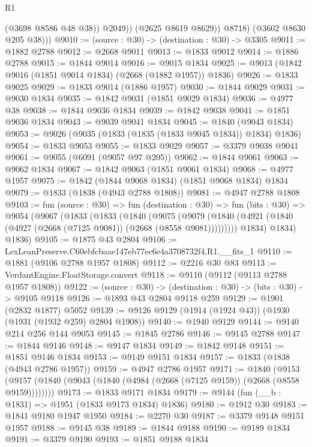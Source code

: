 \begin{lexlean}{R1}
\begin{coremodule}
                  (@3698 @8586 @48 @38))
                @2049))
            (@2625 @8619 @8629))
          @8718)
        (@3602 @8630 @205 @38)))
@9010 := (source : @30) -> (destination : @30) -> @3305
@9011 := @1882 @2788
@9012 := @2668 @9011
@9013 := @1833 @9012
@9014 := @1886 @2788
@9015 := @1844 @9014
@9016 := @9015 @1834
@9025 := @9013 (@1842 @9016 (@1851 @9014 @1834) (@2668 (@1882 @1957)) @1836)
@9026 := @1833 @9025
@9029 := @1833 @9014 (@1886 @1957)
@9030 := @1844 @9029
@9031 := @9030 @1834
@9035 := @1842 @9031 (@1851 @9029 @1834)
@9036 := @4977 @38
@9038 := @1844 @9036 @1834
@9039 := @1842 @9038
@9041 := @1851 @9036 @1834
@9043 := @9039 @9041 @1834
@9045 := @1840 (@9043 @1834)
@9053 := @9026 (@9035 (@1833 (@1835 (@1833 @9045 @1834)) @1834) @1836)
@9054 := @1833 @9053
@9055 := @1833 @9029
@9057 := @3379 @9038 @9041
@9061 := @9055 (@6091 (@9057 @97 @205))
@9062 := @1844 @9061
@9063 := @9062 @1834
@9067 := @1842 @9063 (@1851 @9061 @1834)
@9068 := @4977 @1957
@9075 := @1842 (@1844 @9068 @1834) (@1851 @9068 @1834) @1834
@9079 := @1833 (@1838 (@4943 @2788 @1808))
@9081 := @4947 @2788 @1808
@9103 := fun (source : @30) =>
  fun (destination : @30) =>
  fun (bits : @30) =>
  @9054
    (@9067
      (@1833
        (@1833
          (@1840
            (@9075
              (@9079 (@1840 (@4921 (@1840 (@4927 (@2668 (@7125 @9081)) (@2668 (@8558 @9081)))))))))
          @1834)
        @1834)
      @1836)
@9105 := @1875 @43 @2804
@9106 := LexLeanPreserve.C60ebfcbaae147eb77ec6e4a3708732f4.R1.__fits_1
@9110 := @1881 (@9106 @2788 @1957 @1808)
@9112 := @2216 @30 @83
@9113 := VerdantEngine.FloatStorage.convert
@9118 := @9110 (@9112 (@9113 @2788 @1957 @1808))
@9122 := (source : @30) -> (destination : @30) -> (bits : @30) -> @9105 @9118
@9126 := @1893 @43 @2804 @9118 @259
@9129 := @1901 (@2832 @1877) @5052
@9139 := @9126 @9129 (@1914 (@1924 @43)) (@1930 (@1931 (@1932 @259) @2804 @1908))
@9140 := @1940 @9129
@9144 := @9140 @214 @256 @144 @9053
@9145 := @1845 @2786
@9146 := @9145 @2788
@9147 := @1844 @9146
@9148 := @9147 @1834
@9149 := @1842 @9148
@9151 := @1851 @9146 @1834
@9153 := @9149 @9151 @1834
@9157 := @1833 (@1838 (@4943 @2786 @1957))
@9159 := @4947 @2786 @1957
@9171 := @1840
    (@9153 (@9157 (@1840 (@9043 (@1840 (@4984 (@2668 (@7125 @9159)) (@2668 (@8558 @9159))))))))
@9173 := @1833 @9171 @1834
@9179 := @9144 (fun (__b : @1831) => @1951 (@1833 @9173 @1834) @1836)
@9180 := @1912 @30
@9183 := @1841 @9180 @1947 @1950
@9184 := @2270 @30
@9187 := @3379 @9148 @9151 @1957
@9188 := @9145 @38
@9189 := @1844 @9188
@9190 := @9189 @1834
@9191 := @3379 @9190
@9193 := @1851 @9188 @1834

\end{coremodule}
\end{lexlean}
